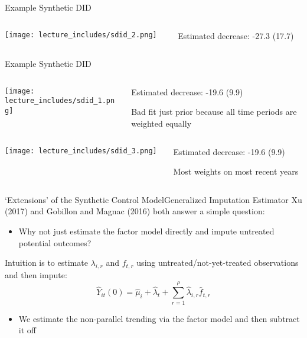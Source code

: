 \documentclass[t]{beamer}
\begin{document}
\begin{frame}{Example Synthetic DID}
  \begin{columns}[T]
    \begin{column}{.65\textwidth}
      \texttt{[image: lecture\_includes/sdid\_2.png]}
    \end{column}
    \hfill
    \begin{column}{.3\textwidth}
      Estimated decrease: -27.3 (17.7)
    \end{column}
  \end{columns}
\end{frame}

\begin{frame}{Example Synthetic DID}
  \begin{columns}[T]
    \begin{column}{.65\textwidth}
      \texttt{[image: lecture\_includes/sdid\_1.png]}
    \end{column}
    \hfill
    \begin{column}{.3\textwidth}
      Estimated decrease: -19.6 (9.9)
      
      \bigskip Bad fit just prior because all time periods are weighted equally
    \end{column}
  \end{columns}
\end{frame}

\begin{columns}[T]
  \begin{column}{.65\textwidth}
    \texttt{[image: lecture\_includes/sdid\_3.png]}
  \end{column}
  \hfill
  \begin{column}{.3\textwidth}
    Estimated decrease: -19.6 (9.9)
    
    \bigskip Most weights on most recent years
  \end{column}
\end{columns}


\begin{frame}{`Extensions' of the Synthetic Control Model}{Generalized Imputation Estimator}
  Xu (2017) and Gobillon and Magnac (2016) both answer a simple question:
  \begin{itemize}
    \item Why not just estimate the factor model directly and impute untreated potential outcomes?
  \end{itemize}

  \bigskip
  Intuition is to estimate $\lambda_{i,r}$ and $f_{t,r}$ using untreated/not-yet-treated observations and then impute:
  $$
    \hat{Y}_{it}(0) = \hat{\mu}_i + \hat{\lambda}_t + \sum_{r=1}^\rho \hat{\lambda}_{i, r} \hat{f}_{t, r}
  $$
  \begin{itemize}
    \item We estimate the non-parallel trending via the factor model and then subtract it off
  \end{itemize}
\end{frame}
\end{document}
